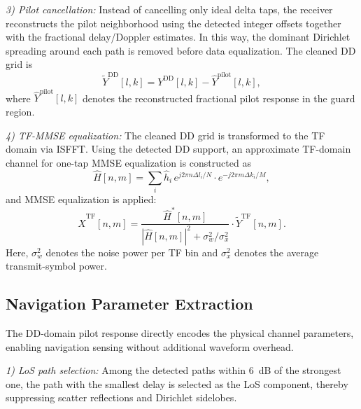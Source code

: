 ﻿\documentclass[conference]{IEEEtran}
\begin{document}
\textit{3) Pilot cancellation:} Instead of cancelling only ideal delta taps, the receiver reconstructs the pilot neighborhood using the detected integer offsets together with the fractional delay/Doppler estimates. In this way, the dominant Dirichlet spreading around each path is removed before data equalization. The cleaned DD grid is
\begin{equation}\label{eq:pilot_cancel}
  \tilde{Y}^{\mathrm{DD}}[l,k] = Y^{\mathrm{DD}}[l,k] - \hat{Y}^{\mathrm{pilot}}[l,k],
\end{equation}
where $\hat{Y}^{\mathrm{pilot}}[l,k]$ denotes the reconstructed fractional pilot response in the guard region.

\textit{4) TF-MMSE equalization:} The cleaned DD grid is transformed to the TF domain via ISFFT. Using the detected DD support, an approximate TF-domain channel for one-tap MMSE equalization is constructed as
\begin{equation}\label{eq:tf_eq}
  \hat{H}[n,m] = \sum_{i} \hat{h}_i \, e^{j2\pi n \Delta l_i / N} \cdot e^{-j2\pi m \Delta k_i / M},
\end{equation}
and MMSE equalization is applied:
\begin{equation}\label{eq:mmse_eq}
  \hat{X}^{\mathrm{TF}}[n,m] = \frac{\hat{H}^{*}[n,m]}{|\hat{H}[n,m]|^2 + \sigma_w^2/\sigma_x^2} \cdot \tilde{Y}^{\mathrm{TF}}[n,m].
\end{equation}
Here, $\sigma_w^2$ denotes the noise power per TF bin and $\sigma_x^2$ denotes the average transmit-symbol power.

\subsection{Navigation Parameter Extraction}

The DD-domain pilot response directly encodes the physical channel parameters, enabling navigation sensing without additional waveform overhead.

\textit{1) LoS path selection:} Among the detected paths within 6~dB of the strongest one, the path with the smallest delay is selected as the LoS component, thereby suppressing scatter reflections and Dirichlet sidelobes.
\end{document}
